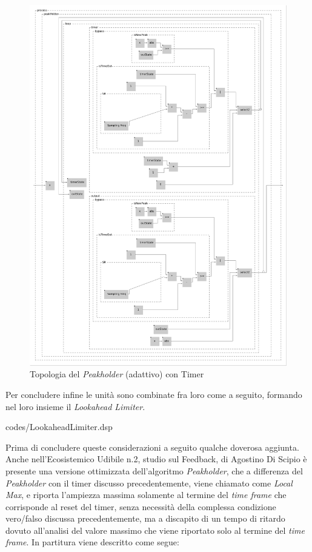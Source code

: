 \begin{figure}[h!]
\begin{center}
    \includegraphics[width=15cm]{figures/PeakHolderAdaptive.pdf}
    \caption{Topologia del \textit{Peakholder} (adattivo) con Timer}
\end{center}
\vspace{0.5cm}
\end{figure}
\clearpage

Per concludere infine le unità sono combinate fra loro come a seguito,
formando nel loro insieme il \textit{Lookahead Limiter}.

\vspace{0.5cm} 

{codes/LookaheadLimiter.dsp}

Prima di concludere queste considerazioni a seguito qualche doverosa aggiunta.
Anche nell'Ecosistemico Udibile n.2, studio sul Feedback, di Agostino Di Scipio è presente 
una versione ottimizzata dell'algoritmo \textit{Peakholder}, che a differenza
del \textit{Peakholder} con il timer discusso precedentemente, viene chiamato come
\textit{Local Max}, e riporta l'ampiezza massima solamente al termine del \textit{time frame} che corrisponde
al reset del timer, senza necessità della complessa condizione vero/falso discussa precedentemente, 
ma a discapito di un tempo di ritardo dovuto all'analisi del valore massimo che viene riportato 
solo al termine del \textit{time frame}.
In partitura viene descritto come segue:

